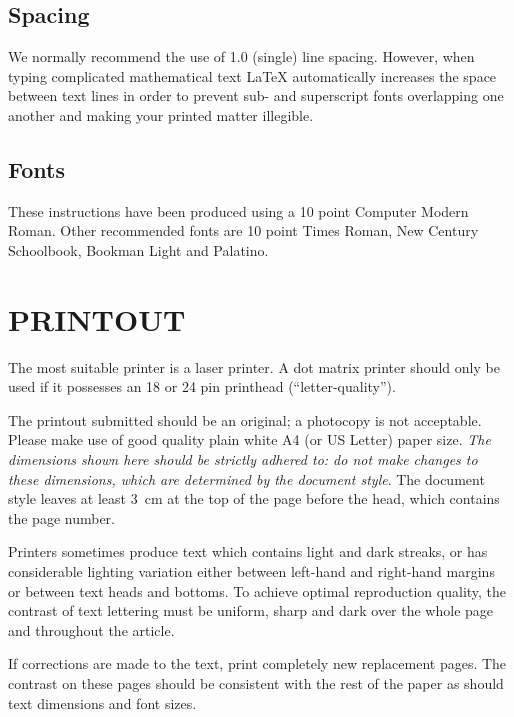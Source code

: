 \subsection{Spacing}

We normally recommend the use of 1.0 (single) line spacing. However,
when typing complicated mathematical text \LaTeX{} automatically
increases the space between text lines in order to prevent sub- and
superscript fonts overlapping one another and making your printed
matter illegible.

\subsection{Fonts}

These instructions have been produced using a 10 point Computer Modern
Roman. Other recommended fonts are 10 point Times Roman, New Century
Schoolbook, Bookman Light and Palatino.

\section{PRINTOUT}

The most suitable printer is a laser printer. A dot matrix printer
should only be used if it possesses an 18 or 24 pin printhead
(``letter-quality'').

The printout submitted should be an original; a photocopy is not
acceptable. Please make use of good quality plain white A4 (or US
Letter) paper size. {\em The dimensions shown here should be strictly
adhered to: do not make changes to these dimensions, which are
determined by the document style}. The document style leaves at least
3~cm at the top of the page before the head, which contains the page
number.

Printers sometimes produce text which contains light and dark streaks,
or has considerable lighting variation either between left-hand and
right-hand margins or between text heads and bottoms. To achieve
optimal reproduction quality, the contrast of text lettering must be
uniform, sharp and dark over the whole page and throughout the article.

If corrections are made to the text, print completely new replacement
pages. The contrast on these pages should be consistent with the rest
of the paper as should text dimensions and font sizes.

